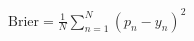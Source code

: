 \documentclass[border=3pt,varwidth=16cm]{standalone}
\begin{document}
$\displaystyle \mathrm{Brier} = \frac{1}{N}\sum_{n=1}^{N} (p_n - y_n)^2$
\end{document}
